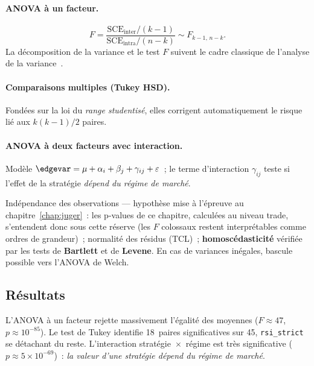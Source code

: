 \paragraph{ANOVA à un facteur.}
\[
  F = \frac{\mathrm{SCE}_{\text{inter}}/(k-1)}
           {\mathrm{SCE}_{\text{intra}}/(n-k)} \sim F_{k-1,\,n-k}.
\]
La décomposition de la variance et le test \(F\) suivent le cadre
classique de l'analyse de la variance~\cite{scheffe1959}.

\paragraph{Comparaisons multiples (Tukey HSD).}
Fondées sur la loi du \emph{range studentisé}, elles corrigent
automatiquement le risque lié aux $k(k-1)/2$ paires.

\paragraph{ANOVA à deux facteurs avec interaction.}
Modèle \(\edgevar = \mu + \alpha_i + \beta_j + \gamma_{ij} + \varepsilon\)~;
le terme d'interaction \(\gamma_{ij}\) teste si l'effet de la stratégie
\emph{dépend du régime de marché}.

\begin{conditions}
Indépendance des observations --- hypothèse mise à l'épreuve au
chapitre~\ref{chap:juger}~: les p-values de ce chapitre, calculées au
niveau trade, s'entendent donc sous cette réserve (les $F$ colossaux
restent interprétables comme ordres de grandeur)~; normalité des résidus
(TCL)~; \textbf{homoscédasticité} vérifiée par les tests de
\textbf{Bartlett} et de \textbf{Levene}. En cas de variances inégales,
bascule possible vers l'ANOVA de Welch.
\end{conditions}

\subsection{Résultats}
L'ANOVA à un facteur rejette massivement l'égalité des moyennes
(\(F\approx 47\), \(p\approx 10^{-85}\)). Le test de Tukey identifie
18~paires significatives sur 45, \texttt{rsi\_strict} se détachant du
reste. L'interaction stratégie~$\times$~régime est très significative
(\(p\approx 5\times10^{-69}\))~: \emph{la valeur d'une stratégie dépend
du régime de marché}.

